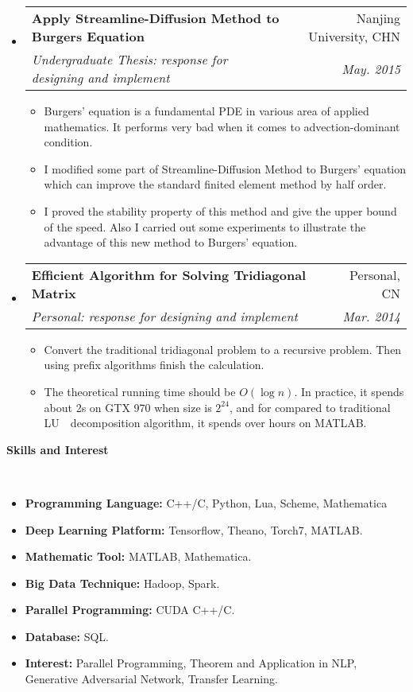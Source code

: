\documentclass[a4paper,11pt]{article}
\makeatletter
\newcommand{\resitem}[1]{\item #1 \vspace{-2pt}}
\renewcommand{\normalsize}{\fontsize{12pt}{\baselineskip}\selectfont}
\newcommand{\resheading}[1]{{\large \colorbox{mygrey}{\begin{minipage}{\textwidth}{\textbf{#1 \vphantom{p\^{E}}}}\end{minipage}}}}
\newcommand{\ressubheading}[4]{
	\begin{tabular*}{6.5in}{l@{\extracolsep{\fill}}r}
		\textbf{#1} & #2 \\
		\textit{#3} & \textit{#4} \\
	\end{tabular*}\vspace{-6pt}}
\makeatother
\begin{document}
\begin{itemize}
				\item \ressubheading{\normalsize Apply Streamline-Diffusion Method to Burgers Equation}{Nanjing University, CHN}{\normalsize Undergraduate Thesis: response for designing and implement}{May. 2015}
				\begin{itemize}
					\resitem{Burgers' equation is a fundamental PDE in various area of applied mathematics. It performs very bad when it comes to advection-dominant condition.}
					\resitem{I modified some part of Streamline-Diffusion Method to Burgers' equation which can improve the standard finited element method by half order.}
					\resitem{I proved the stability property of this method and give the upper bound of the speed. Also I carried out some experiments to illustrate the advantage of this new method to Burgers' equation.}
				\end{itemize}
				\item \ressubheading{\normalsize Efficient Algorithm for Solving Tridiagonal Matrix}{Personal, CN}{\normalsize Personal: response for designing and implement}{Mar. 2014}
				\begin{itemize}
					\resitem{Convert the traditional tridiagonal problem to a recursive problem. Then using prefix algorithms finish the calculation.}
					\resitem{The theoretical running time should be $ O(\log n) $. In practice, it spends about 2s on GTX 970 when size is $ 2^{24} $, and for compared to traditional LU　decomposition algorithm, it spends over hours on MATLAB.} 
				\end{itemize}
		\end{itemize}
		
		\resheading{Skills and Interest}\\
		\begin{itemize}
			\item \textbf{Programming Language:} C++/C, Python, Lua, Scheme, Mathematica
			\item \textbf{Deep Learning Platform:} Tensorflow, Theano, Torch7, MATLAB.
			\item \textbf{Mathematic Tool:} MATLAB, Mathematica.
			\item \textbf{Big Data Technique:} Hadoop, Spark.
			\item \textbf{Parallel Programming:} CUDA C++/C.
			\item \textbf{Database:} SQL.
			\item \textbf{Interest:} Parallel Programming, Theorem and Application in NLP, Generative Adversarial Network, Transfer Learning.
		\end{itemize}
		
\end{document}
